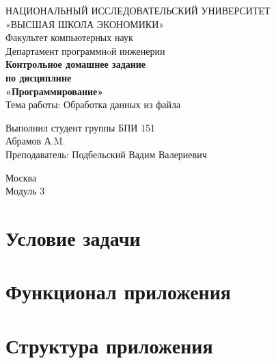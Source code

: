 \documentclass[twoside]{article}
\newcommand{\+}{\discretionary{\mbox{\scriptsize$\hookleftarrow$}}{}{}}
\begin{document}
\begin{titlepage}
\begin{center}
\vspace*{7cm}
{\large НАЦИОНАЛЬНЫЙ ИССЛЕДОВАТЕЛЬСКИЙ УНИВЕРСИТЕТ \\
«ВЫСШАЯ ШКОЛА ЭКОНОМИКИ» }\\
\vspace*{0.5cm}
{\large Факультет компьютерных наук }\\
\vspace*{0.5cm}
{\small Департамент программнoй инженерии \\
}
\vfill %
{\large\textbf{
Контрольное домашнее задание \\
по дисциплине\\
«Программирование» \\
}}
\bigskip
{\large Тема работы: Обработка данных из файла }\\
\vfill
\begin{flushright}
Выполнил студент группы БПИ 151 \\
Абрамов А.M. \\
Преподаватель: Подбельский Вадим Валериевич \\
\end{flushright}
\vfill
Москва \number\year \\
Модуль 3
\end{center}
\end{titlepage}

\tableofcontents
{}

\section{Условие задачи}

\section{Функционал приложения}

\section{Структура приложения}


\end{document}
